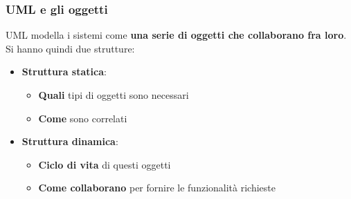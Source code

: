 \documentclass[12pt]{article}
\begin{document}
\subsubsection{UML e gli oggetti}
UML modella i sistemi come \textbf{una serie di oggetti che collaborano fra loro}. Si hanno quindi due strutture:
\begin{itemize}
    \item \textbf{Struttura statica}:
    \begin{itemize}
        \item \textbf{Quali} tipi di oggetti sono necessari
        \item \textbf{Come} sono correlati
    \end{itemize}
    \item \textbf{Struttura dinamica}:
    \begin{itemize}
        \item \textbf{Ciclo di vita} di questi oggetti
        \item \textbf{Come collaborano} per fornire le funzionalità richieste
    \end{itemize}
\end{itemize}
\end{document}
